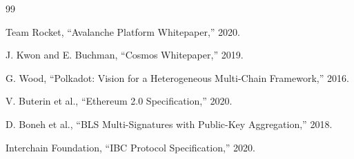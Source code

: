 \documentclass[11pt,a4paper]{article}
\begin{document}
\begin{thebibliography}{99}

Team Rocket, ``Avalanche Platform Whitepaper,'' 2020.

J. Kwon and E. Buchman, ``Cosmos Whitepaper,'' 2019.

G. Wood, ``Polkadot: Vision for a Heterogeneous Multi-Chain Framework,'' 2016.

V. Buterin et al., ``Ethereum 2.0 Specification,'' 2020.

D. Boneh et al., ``BLS Multi-Signatures with Public-Key Aggregation,'' 2018.

Interchain Foundation, ``IBC Protocol Specification,'' 2020.

\end{thebibliography}
\end{document}
